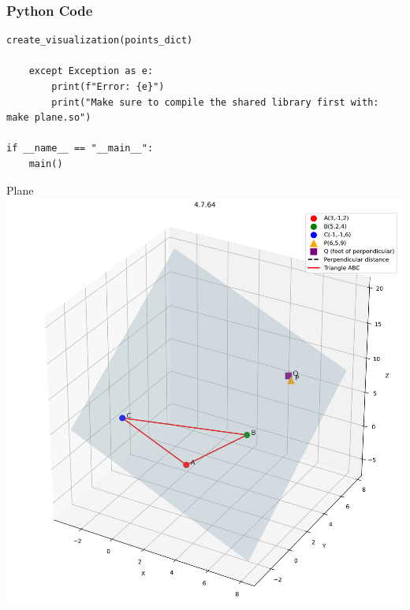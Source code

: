 \documentclass{beamer}
\begin{document}
\begin{frame}[fragile]
    \frametitle{Python Code}
    \begin{lstlisting}
create_visualization(points_dict)

    except Exception as e:
        print(f"Error: {e}")
        print("Make sure to compile the shared library first with: make plane.so")

if __name__ == "__main__":
    main()
    \end{lstlisting}
\end{frame}

\begin{frame}{Plane}
   \centering
    \includegraphics[width=\columnwidth, height=0.8\textheight, keepaspectratio]{figs/fig1.png}
    \label{fig:Beamer/figs/fig1.png}
\end{frame}
\end{document}

